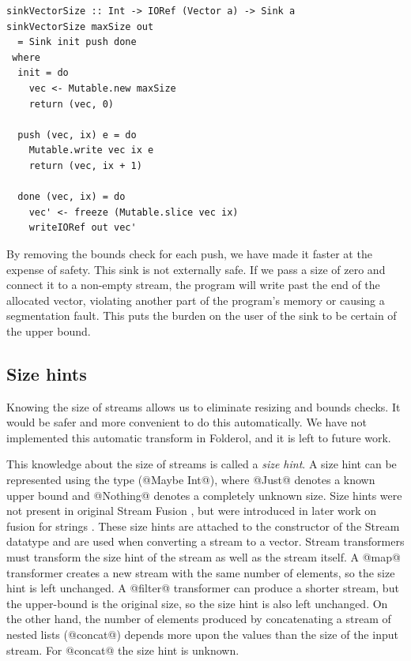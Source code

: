 \begin{lstlisting}
sinkVectorSize :: Int -> IORef (Vector a) -> Sink a
sinkVectorSize maxSize out
  = Sink init push done
 where
  init = do
    vec <- Mutable.new maxSize
    return (vec, 0)

  push (vec, ix) e = do
    Mutable.write vec ix e
    return (vec, ix + 1)

  done (vec, ix) = do
    vec' <- freeze (Mutable.slice vec ix)
    writeIORef out vec'
\end{lstlisting}

By removing the bounds check for each push, we have made it faster at the expense of safety.
This sink is not externally safe.
If we pass a size of zero and connect it to a non-empty stream, the program will write past the end of the allocated vector, violating another part of the program's memory or causing a segmentation fault.
This puts the burden on the user of the sink to be certain of the upper bound.

\subsection{Size hints}
\label{s:implementation:sizehints}


Knowing the size of streams allows us to eliminate resizing and bounds checks.
It would be safer and more convenient to do this automatically.
We have not implemented this automatic transform in Folderol, and it is left to future work.

This knowledge about the size of streams is called a \emph{size hint}.
A size hint can be represented using the type (@Maybe Int@), where @Just@ denotes a known upper bound and @Nothing@ denotes a completely unknown size.
Size hints were not present in original Stream Fusion \cite{coutts2007stream}, but were introduced in later work on fusion for strings \cite{coutts2007rewriting}.
These size hints are attached to the constructor of the Stream datatype and are used when converting a stream to a vector.
Stream transformers must transform the size hint of the stream as well as the stream itself.
A @map@ transformer creates a new stream with the same number of elements, so the size hint is left unchanged.
A @filter@ transformer can produce a shorter stream, but the upper-bound is the original size, so the size hint is also left unchanged.
On the other hand, the number of elements produced by concatenating a stream of nested lists (@concat@) depends more upon the values than the size of the input stream.
For @concat@ the size hint is unknown.

